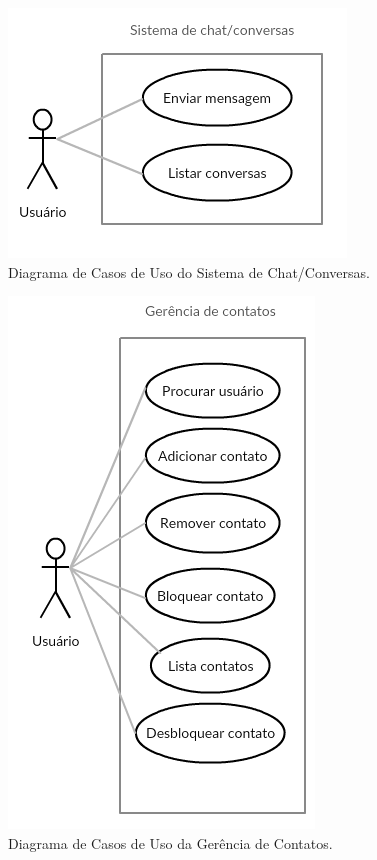 \documentclass[11pt,a4paper,titlepage]{article}
\begin{document}
\begin{figure}[!htb]
	\centering
	\includegraphics[scale=0.8]{img/casoschat.png}
	\caption{Diagrama de Casos de Uso do Sistema de Chat/Conversas.}
\end{figure}
\pagebreak
\begin{figure}[!htb]
	\centering
	\includegraphics[scale=0.8]{img/casoscontatos.png}
	\caption{Diagrama de Casos de Uso da Gerência de Contatos.}
\end{figure}
\pagebreak
\end{document}
